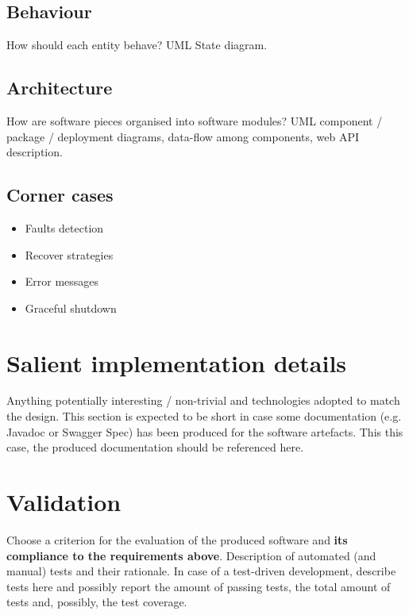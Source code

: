 \documentclass{scrartcl}
\begin{document}
\subsection{Behaviour}

How should each entity behave?
%
UML State diagram.

\subsection{Architecture}

How are software pieces organised into software modules?
%
UML component / package / deployment diagrams, data-flow among components, web API description.

\subsection{Corner cases}

\begin{itemize}
    \item Faults detection
    \item Recover strategies
    \item Error messages
    \item Graceful shutdown
\end{itemize}

\section{Salient implementation details}

Anything potentially interesting / non-trivial and technologies adopted to match the design.
%
This section is expected to be short in case some documentation (e.g. Javadoc or Swagger Spec) has been produced for the software artefacts.
%
This this case, the produced documentation should be referenced here.

\section{Validation}

Choose a criterion for the evaluation of the produced software and \textbf{its compliance to the requirements above}.
%
Description of automated (and manual) tests and their rationale.
%
In case of a test-driven development, describe tests here and possibly report the amount of passing tests, the total amount of tests and, possibly, the test coverage.
\end{document}
